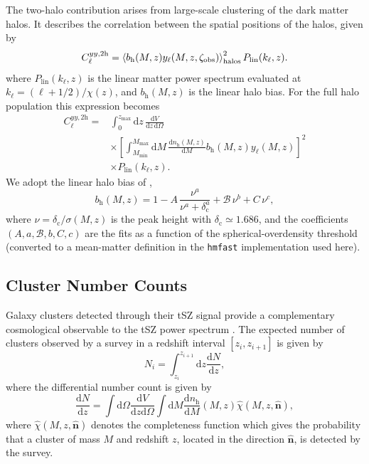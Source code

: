 \documentclass[aps,prd,twocolumn,superscriptaddress,nofootinbib,floatfix]{revtex4-2}
\begin{document}
The two-halo contribution arises from large-scale clustering of the dark matter halos. It describes the correlation between the spatial positions of the halos, given by 
\begin{equation}
C_{\ell}^{yy,\mathrm{2h}}
=
\left\langle
b_{\mathrm{h}}(M,z)
y_{\ell}(M,z,\zeta_{\rm obs})
\right\rangle_{\mathrm{halos}}^2
P_{\mathrm{lin}}(k_{\ell},z).
\label{eq:tsz_two_halo}
\end{equation}
where $P_{\mathrm{lin}}(k_{\ell},z)$ is the linear matter power spectrum evaluated at $k_{\ell}=(\ell+1/2)/\chi(z)$, and $b_{\mathrm{h}}(M,z)$ is the linear halo bias. For the full halo population this expression becomes
\begin{equation}
\begin{aligned}
C_{\ell}^{yy,\mathrm{2h}}
={}&
\int_{0}^{z_{\mathrm{max}}}
\mathrm{d}z\,
\frac{\mathrm{d}V}
{\mathrm{d}z\,\mathrm{d}\Omega}
\\
&\times
\left[
\int_{M_{\mathrm{min}}}^{M_{\mathrm{max}}}
\mathrm{d}M\,
\frac{\mathrm{d}n_{\mathrm{h}}(M,z)}
{\mathrm{d}M}
b_{\mathrm{h}}(M,z)
y_{\ell}(M,z)
\right]^2
\\
&\times
P_{\mathrm{lin}}(k_{\ell},z).
\end{aligned}
\label{eq:tsz_two_halo_full}
\end{equation}
We adopt the linear halo bias of \citet{Tinker:2010},
\begin{equation}
b_{\mathrm{h}}(M,z)
=
1
-
A\,
\frac{\nu^{a}}{\nu^{a}+\delta_{\mathrm{c}}^{a}}
+
\mathcal{B}\,\nu^{b}
+
C\,\nu^{c},
\label{eq:tinker_bias}
\end{equation}
where $\nu=\delta_{\mathrm{c}}/\sigma(M,z)$ is the peak height with
$\delta_{\mathrm{c}}\simeq 1.686$, and the coefficients
$(A,a,\mathcal{B},b,C,c)$ are the \citet{Tinker:2010} fits as a function of
the spherical-overdensity threshold (converted to a mean-matter definition
in the \texttt{hmfast} implementation used here).

\subsection{Cluster Number Counts}
Galaxy clusters detected through their tSZ signal provide a complementary cosmological observable to the tSZ power spectrum \citep{Planck2015XXIV,ZubeldiaBolliet2024}. The expected number of clusters observed by a survey in a redshift interval $[z_i,z_{i+1}]$ is given by
\begin{equation}
N_i
=
\int_{z_i}^{z_{i+1}}
\mathrm{d}z
\frac{\mathrm{d}N}{\mathrm{d}z},
\label{eq:cluster_counts_redshift_bin}
\end{equation}
where the differential number count is given by
\begin{equation}
\frac{\mathrm{d}N}{\mathrm{d}z}
=
\int \mathrm{d}\Omega
\frac{\mathrm{d}V}{\mathrm{d}z\mathrm{d}\Omega}
\int \mathrm{d}M
\frac{\mathrm{d}n_{\mathrm{h}}}{\mathrm{d}M}(M,z)
\hat{\chi}(M,z,\hat{\bm{n}}),
\label{eq:dNdz}
\end{equation}
where $\hat{\chi}(M,z,\hat{\bm{n}})$ denotes the completeness function which gives the probability that a cluster of mass $M$ and redshift $z$, located in the direction $\hat{\bm{n}}$, is detected by the survey.
\end{document}
